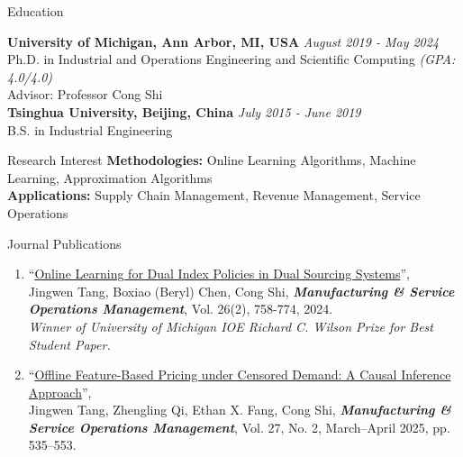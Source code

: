 \documentclass{resume}
\begin{document}

\begin{rSection}{Education}

{\bf University of Michigan, Ann Arbor, MI, USA} \hfill {\em August 2019 - May 2024} 
\\ Ph.D. in Industrial and Operations Engineering and Scientific Computing \hfill{\em  (GPA: 4.0/4.0)}
\\Advisor: Professor Cong Shi \hfill
\\{\bf Tsinghua University, Beijing, China} \hfill {\em July 2015 - June 2019} 
\\ B.S. in Industrial Engineering
\end{rSection}

\begin{rSection}{Research Interest}
 {\bf Methodologies: } Online Learning Algorithms, Machine Learning, Approximation Algorithms\\
 {\bf Applications: } Supply Chain Management, Revenue Management, Service Operations
\end{rSection}


\begin{rSection}{Journal Publications}
\begin{enumerate}
    \item ``\href{https://pubsonline.informs.org/doi/10.1287/msom.2022.0323}{Online Learning for Dual Index Policies in Dual Sourcing Systems}'', \\ Jingwen Tang, Boxiao (Beryl) Chen, Cong Shi, \emph{\textbf{Manufacturing \& Service Operations Management}}, Vol. 26(2), 758-774, 2024. \\
    {\it Winner of University of Michigan IOE Richard C. Wilson Prize for Best Student Paper.}

  \item ``\href{https://pubsonline.informs.org/doi/10.1287/msom.2024.1061}{Offline Feature-Based Pricing under Censored Demand: A Causal Inference Approach}'', \\Jingwen Tang, Zhengling Qi, Ethan X. Fang, Cong Shi, \emph{\textbf{Manufacturing \& Service Operations Management}}, Vol. 27, No. 2, March–April 2025, pp. 535–553. 

\end{enumerate}
\end{rSection}
\end{document}
